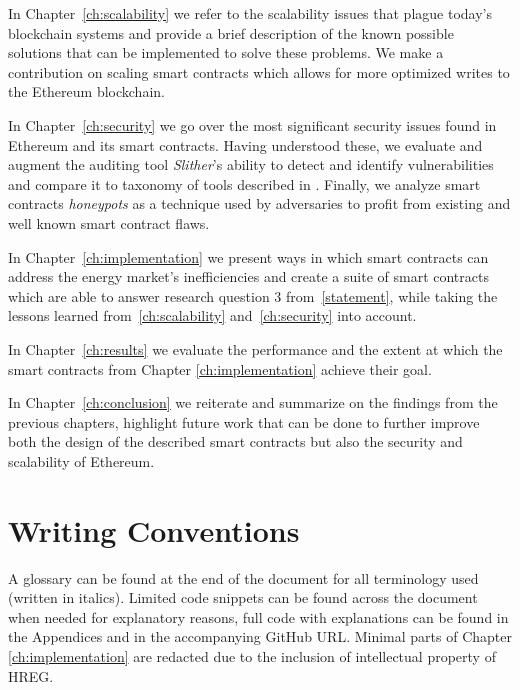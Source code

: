 In Chapter~\ref{ch:scalability} we refer to the scalability issues that plague today's blockchain systems and provide a brief description of the known possible solutions that can be implemented to solve these problems. We make a contribution on scaling smart contracts which allows for more optimized writes to the Ethereum blockchain.

In Chapter~\ref{ch:security} we go over the most significant security issues found in Ethereum and its smart contracts. Having understood these, we evaluate and augment the auditing tool \textit{Slither}'s ability to detect and identify vulnerabilities and compare it to taxonomy of tools described in \cite{tools}. Finally, we analyze smart contracts \textit{honeypots} as a technique used by adversaries to profit from existing and well known smart contract flaws.

In Chapter~\ref{ch:implementation} we present ways in which smart contracts can address the energy market's inefficiencies and create a suite of smart contracts which are able to answer research question 3 from~\ref{statement}, while taking the lessons learned from~\ref{ch:scalability} and~\ref{ch:security} into account.

In Chapter~\ref{ch:results} we evaluate the performance and the extent at which the smart contracts from Chapter \ref{ch:implementation} achieve their goal. 

In Chapter~\ref{ch:conclusion} we reiterate and summarize on the findings from the previous chapters, highlight future work that can be done to further improve both the design of the described smart contracts but also the security and scalability of Ethereum.

\section{Writing Conventions}
A glossary can be found at the end of the document for all terminology used (written in italics). Limited code snippets can be found across the document when needed for explanatory reasons, full code with explanations can be found in the Appendices and in the accompanying GitHub URL\@. Minimal parts of Chapter \ref{ch:implementation} are redacted due to the inclusion of intellectual property of HREG.